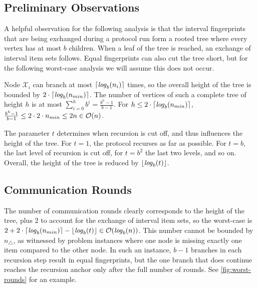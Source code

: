 \subsection{Preliminary Observations}

A helpful observation for the following analysis is that the interval fingerprints that are being exchanged during a protocol run form a rooted tree where every vertex has at most $b$ children. When a leaf of the tree is reached, an exchange of interval item sets follows. Equal fingerprints can also cut the tree short, but for the following worst-case analysis we will assume this does not occur.

Node $\mathcal{X}_i$ can branch at most $\lceil\mathit{log}_{b}(n_i)\rceil$ times, so the overall height of the tree is bounded by $2 \cdot\lceil\mathit{log}_{b}(n_{min})\rceil$. The number of vertices of such a complete tree of height $h$ is at most $\sum_{i=0}^{h} b^{i} = \frac{b^{h} - 1}{b - 1}$. For $h \leq 2 \cdot\lceil\mathit{log}_{b}(n_{min})\rceil$, $\frac{b^{h} - 1}{b - 1} \leq 2 \cdot 2 \cdot n_{min} \leq 2n \in \mathcal{O}(n)$.

The parameter $t$ determines when recursion is cut off, and thus influences the height of the tree. For $t = 1$, the protocol recurses as far as possible. For $t = b$, the last level of recursion is cut off, for $t = b^2$ the last two levels, and so on. Overall, the height of the tree is reduced by $\lfloor\mathit{log}_{b}(t)\rfloor$.

\subsection{Communication Rounds}

The number of communication rounds clearly corresponds to the height of the tree, plus $2$ to account for the exchange of interval item sets, so the worst-case is $2 + 2 \cdot\lceil\mathit{log}_{b}(n_{min})\rceil - \lfloor\mathit{log}_{b}(t)\rfloor \in \mathcal{O}(\mathit{log}_{b}(n))$. This number cannot be bounded by $n_{\triangle}$, as witnessed by problem instances where one node is missing exactly one item compared to the other node. In such an instance, $b - 1$ branches in each recursion step result in equal fingerprints, but the one branch that does continue reaches the recursion anchor only after the full number of rounds. See \cref{fig:worst-rounds} for an example.

